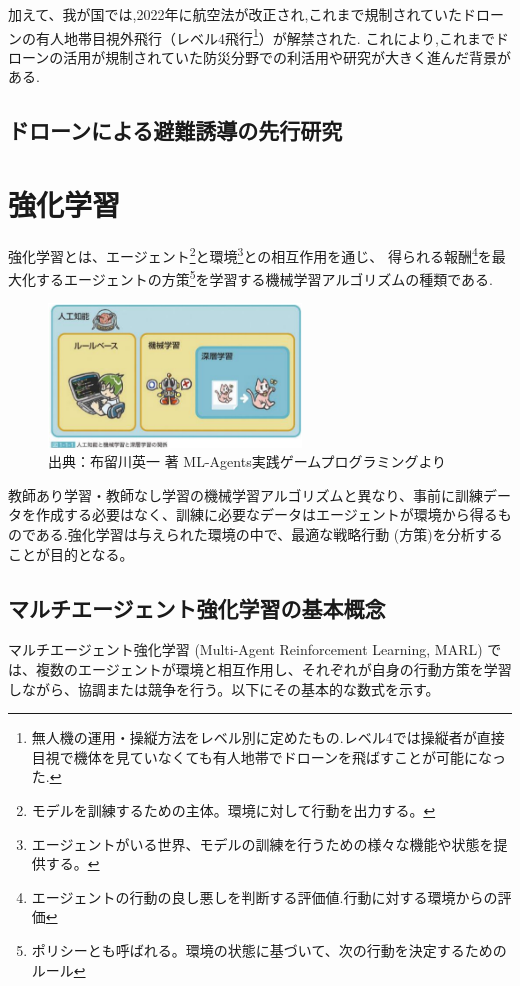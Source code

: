 加えて、我が国では,2022年に航空法が改正され,これまで規制されていたドローンの有人地帯目視外飛行（レベル4飛行\footnote{無人機の運用・操縦方法をレベル別に定めたもの.レベル4では操縦者が直接目視で機体を見ていなくても有人地帯でドローンを飛ばすことが可能になった.}）が解禁された.
これにより,これまでドローンの活用が規制されていた防災分野での利活用や研究が大きく進んだ背景がある.\par 
\subsection{ドローンによる避難誘導の先行研究}

\section{強化学習}
強化学習とは、エージェント\footnote{モデルを訓練するための主体。環境に対して行動を出力する。}と環境\footnote{エージェントがいる世界、モデルの訓練を行うための様々な機能や状態を提供する。}との相互作用を通じ、
得られる報酬\footnote{エージェントの行動の良し悪しを判断する評価値.行動に対する環境からの評価}を最大化するエージェントの方策\footnote{ポリシーとも呼ばれる。環境の状態に基づいて、次の行動を決定するための
ルール}を学習する機械学習アルゴリズムの種類である.
\begin{figure}[H] 
  \centering 
  \includegraphics[width=0.6\textwidth]{Figures/IntroReinforce.png}
  \caption{出典：布留川英一 著 ML-Agents実践ゲームプログラミングより} 
  \label{fig:01} 
\end{figure}
教師あり学習・教師なし学習の機械学習アルゴリズムと異なり、事前に訓練データを作成する必要はなく、訓練に必要なデータはエージェントが環境から得るものである.強化学習は与えられた環境の中で、最適な戦略行動 (方策)を分析することが目的となる。

\subsection{マルチエージェント強化学習の基本概念}

マルチエージェント強化学習 (Multi-Agent Reinforcement Learning, MARL) では、複数のエージェントが環境と相互作用し、それぞれが自身の行動方策を学習しながら、協調または競争を行う。以下にその基本的な数式を示す。

